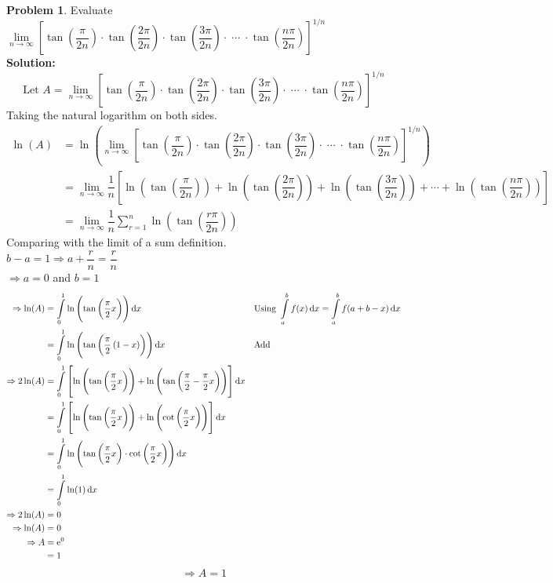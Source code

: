 \documentclass[14]{article}
\theoremstyle{definition}
\newtheorem{prob}{Problem}
\theoremstyle{case}
\begin{document}
\pagebreak
\begin{prob}
Evaluate $\lim\limits_{n \to \infty} \left[ \tan\left( \dfrac{\pi}{2n} \right) \cdot \tan\left(\dfrac{2\pi}{2n}\right) \cdot \tan\left(\dfrac{3\pi}{2n}\right) \cdot \; \cdots \; \cdot \tan\left(\dfrac{n\pi}{2n}\right) \right]^{1/n}$\\
\textbf{Solution:}
\[\text{Let } A = \lim\limits_{n \to \infty} \left[ \tan\left( \dfrac{\pi}{2n} \right) \cdot \tan\left(\dfrac{2\pi}{2n}\right) \cdot \tan\left(\dfrac{3\pi}{2n}\right) \cdot \; \cdots \; \cdot \tan\left(\dfrac{n\pi}{2n}\right) \right]^{1/n}\]
Taking the natural logarithm on both sides.
\begin{align*}
\ln(A) &= \ln\left(\lim\limits_{n \to \infty} \left[ \tan\left( \dfrac{\pi}{2n} \right) \cdot \tan\left(\dfrac{2\pi}{2n}\right) \cdot \tan\left(\dfrac{3\pi}{2n}\right) \cdot \; \cdots \; \cdot \tan\left(\dfrac{n\pi}{2n}\right) \right]^{1/n}\right)\\
&= \lim\limits_{n \to \infty} \dfrac1{n} \left[
\ln\left(\tan\left(\dfrac{\pi}{2n}\right)\right) +
\ln\left(\tan\left(\dfrac{2\pi}{2n}\right)\right) +
\ln\left(\tan\left(\dfrac{3\pi}{2n}\right)\right) + \cdots +
\ln\left(\tan\left(\dfrac{n\pi}{2n}\right)\right)
\right]\\
&= \lim\limits_{n \to \infty} \dfrac1{n} \sum\limits_{r=1}^n \ln\left(\tan\left( \dfrac{r\pi}{2n} \right) \right)
\end{align*}
Comparing with the limit of a sum definition.\\
$b - a = 1 \Rightarrow a + \dfrac{r}{n} = \dfrac{r}{n}$\\
$\Rightarrow a = 0$ and $b = 1$
\begin{align*}
\Rightarrow \ln(A) &= \int\limits_0^1 \ln\left(\tan\left( \dfrac{\pi}{2}x \right)\right) \dif x && \text{Using } \int\limits_a^b f(x) \dif x = \int\limits_a^b f(a+b-x) \dif x\\
&= \int\limits_0^1 \ln\left( \tan\left(\dfrac{\pi}{2}\left(1 - x\right)\right) \right) \dif x && \text{Add}\\
\Rightarrow 2\ln(A) &= \int\limits_0^1 \left[  \ln\left(\tan\left( \dfrac{\pi}{2}x \right)\right) + \ln\left( \tan\left(\dfrac{\pi}{2} - \dfrac{\pi}{2}x\right) \right) \right] \dif x\\
&= \int\limits_0^1 \left[  \ln\left(\tan\left( \dfrac{\pi}{2}x \right)\right) + \ln\left( \cot\left(\dfrac{\pi}{2}x\right) \right) \right] \dif x \\
&= \int\limits_0^1 \ln\left( \tan\left(\dfrac{\pi}{2}x\right) \cdot \cot\left(\dfrac{\pi}{2}x\right) \right) \dif x\\
&= \int\limits_0^1 \ln(1) \dif x\\
\Rightarrow 2\ln(A) &= 0\\
\Rightarrow \ln(A) &= 0\\
\Rightarrow A &= {\rm e}^0\\
&= 1
\end{align*}
\[\Rightarrow A = 1\]
\end{prob}
\pagebreak
\end{document}
